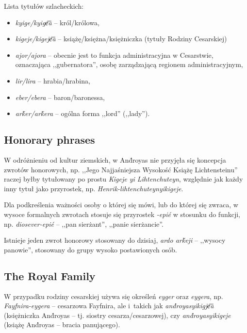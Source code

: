 Lista tytułów szlacheckich:

\begin{itemize}
    \item \emph{kyige/kyige͞a} -- król/królowa,
    \item \emph{kigeje/kigeje͞a} -- książę/księżna/księżniczka (tytuły Rodziny
          Cesarskiej)
    \item \emph{ajor/ajora} -- obecnie jest to funkcja administracyjna w
          Cesarstwie, oznaczająca ,,gubernatora'', osobę zarządzającą regionem
          administracyjnym,
    \item \emph{lir/lira} -- hrabia/hrabina,
    \item \emph{eber/ebera} -- baron/baronessa,
    \item \emph{arḱer/arḱera} -- ogólna forma ,,lord'' (,,lady'').
\end{itemize}

\subsection{Honorary phrases}

W odróżnieniu od kultur ziemskich, w And́royas nie przyjęła się koncepcja
zwrotów honorowych, np. ,,Jego Najjaśniejsza Wysokość Książę Lichtensteinu''
raczej byłby tytułowany po prostu \emph{Kigeje yi Lihtenchuteyn}, względnie jak
każdy inny tytuł jako przyrostek, np. \emph{Henrik-lihtenchuteynyikigeje}.

Dla podkreślenia ważności osoby o której się mówi, lub do której się zwraca, w
wysoce formalnych zwrotach stosuje się przyrostek \emph{-epié} w stosunku do
funkcji, np. \emph{diosever-epié} -- ,,pan sierżant'', ,,panie sierżancie''.


Istnieje jeden zwrot honorowy stosowany do dzisiaj, \emph{ardo arḱeji} --
,,wysocy panowie'', stosowany do grupy wysoko postawionych osób.

\subsection{The Royal Family}

W przypadku rodziny cesarskiej używa się określeń \emph{eyger} oraz
\emph{eygera}, np. \emph{Fayfnira-eygera} -- cesarzowa Fayfnira, ale i~takich
jak \emph{and́royasyikigje͞a} (księżniczka And́royas -- tj. siostry
cesarza/cesarzowej), czy \emph{and́royasyikigeje} (książę And́royas -- bracia
panującego).

